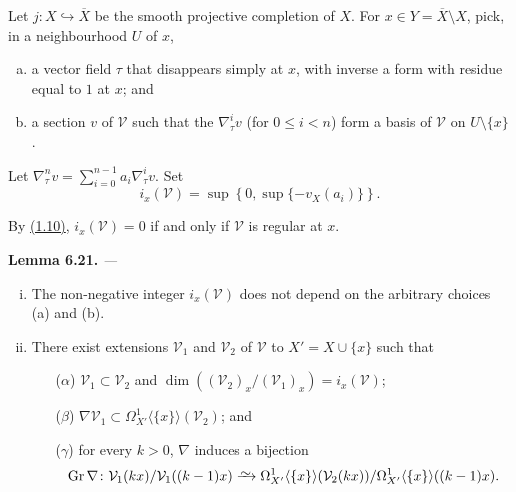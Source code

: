 \documentclass{report}
\newenvironment{itenv}[1]
  {\phantomsection\par\medskip\noindent\textbf{#1.}\itshape}
  {\par\medskip}
\renewcommand{\cal}[1]{{\mathcal{#1}}}
\newcommand{\simto}{\xrightarrow{\raisebox{-0.7ex}[0ex][0ex]{$\sim$}}}
\renewcommand{\leq}{\leqslant}
\DeclareMathOperator{\Gr}{Gr}
\begin{document}
Let $j\colon X\hookrightarrow\overline{X}$ be the smooth projective completion of $X$.
For $x\in Y=\overline{X}\setminus X$, pick, in a neighbourhood $U$ of $x$,
\begin{enumerate}[(a)]
  \item a vector field $\tau$ that disappears simply at $x$, with inverse a form with residue equal to $1$ at $x$; and
  \item a section $v$ of $\cal{V}$ such that the $\nabla_\tau^i v$ (for $0\leq i<n$) form a basis of $\cal{V}$ on $U\setminus\{x\}$.
\end{enumerate}

Let $\nabla_\tau^n v=\sum_{i=0}^{n-1}a_i\nabla_\tau^i v$.
Set
\[
  i_x(\cal{V}) = \sup\left\{0,\sup\{-v_X(a_i)\}\right\}.
\]

By \hyperref[II.1.10]{(1.10)}, $i_x(\cal{V})=0$ if and only if $\cal{V}$ is regular at $x$.

\begin{itenv}{Lemma 6.21}
\label{II.6.21}
---
\begin{enumerate}[(i)]
  \item The non-negative integer $i_x(\cal{V})$ does not depend on the arbitrary choices (a) and (b).
  \item There exist extensions $\cal{V}_1$ and $\cal{V}_2$ of $\cal{V}$ to $X'=X\cup\{x\}$ such that
    \begin{enumerate}
      \item[($\alpha$)] $\cal{V}_1\subset\cal{V}_2$ and $\dim((\cal{V}_2)_x/(\cal{V}_1)_x)=i_x(\cal{V})$;
      \item[($\beta$)] $\nabla\cal{V}_1\subset\Omega_{X'}^1\langle\{x\}\rangle(\cal{V}_2)$; and
      \item[($\gamma$)] for every $k>0$, $\nabla$ induces a bijection
        \[
          \Gr\nabla\colon
          \cal{V}_1(kx)/\cal{V}_1((k-1)x)
          \simto \Omega_{X'}^1\langle\{x\}\rangle(\cal{V}_2(kx))/\Omega_{X'}^1\langle\{x\}\rangle((k-1)x).
        \]
    \end{enumerate}
\end{enumerate}
\end{itenv}
\end{document}
